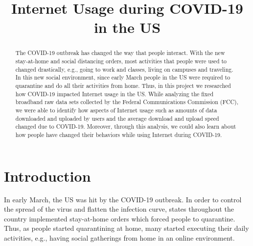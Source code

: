 \documentclass[conference,10pt]{IEEEtran}
\begin{document}
\title{Internet Usage during COVID-19 in the US}

\author{
    \and
}

\maketitle

\begin{abstract}
The COVID-19 outbreak has changed the way that people interact. With the new stay-at-home and social distancing orders, most activities that people were used to changed drastically, e.g., going to work and classes, living on campuses and traveling. In this new social environment, since early March people in the US were required to quarantine and do all their activities from home. Thus, in this project we researched how COVID-19 impacted Internet usage in the US. While analyzing the fixed broadband raw data sets collected by the Federal Communications Commission (FCC), we were able to identify how aspects of Internet usage such as amounts of data downloaded and uploaded by users and the average download and upload speed changed due to COVID-19. Moreover, through this analysis, we could also learn about how people have changed their behaviors while using Internet during COVID-19.
\end{abstract}

\section{Introduction}
\label{sec:introduction}

In early March, the US was hit by the COVID-19 outbreak. In order to control the spread of the virus and flatten the infection curve, states throughout the country implemented stay-at-home orders which forced people to quarantine. Thus, as people started quarantining at home, many started executing their daily activities, e.g., having social gatherings from home in an online environment.
\end{document}
